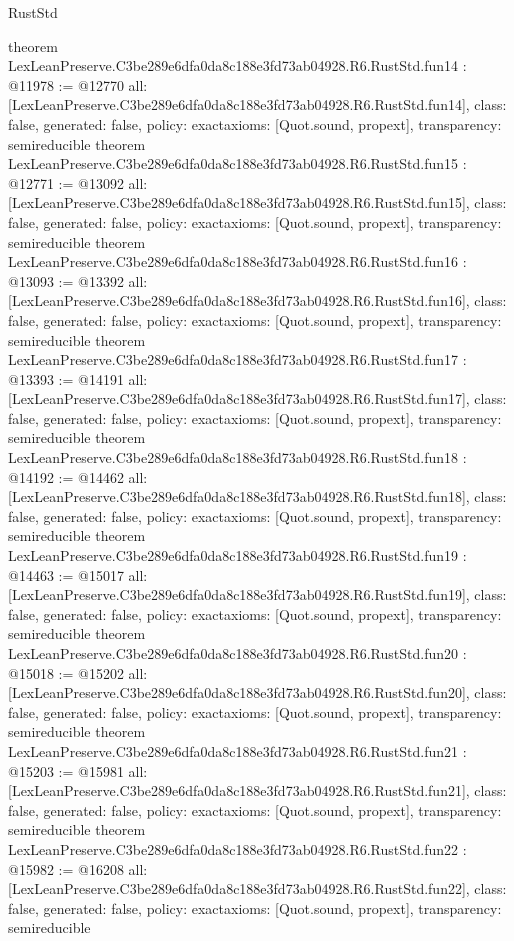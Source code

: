 \begin{lexlean}{RustStd}
\begin{coremodule}
{}
theorem LexLeanPreserve.C3be289e6dfa0da8c188e3fd73ab04928.R6.RustStd.fun14 : @11978 := @12770 {
  all: [LexLeanPreserve.C3be289e6dfa0da8c188e3fd73ab04928.R6.RustStd.fun14],
  class: false,
  generated: false,
  policy: exact{axioms: [Quot.sound, propext]},
  transparency: semireducible
}
theorem LexLeanPreserve.C3be289e6dfa0da8c188e3fd73ab04928.R6.RustStd.fun15 : @12771 := @13092 {
  all: [LexLeanPreserve.C3be289e6dfa0da8c188e3fd73ab04928.R6.RustStd.fun15],
  class: false,
  generated: false,
  policy: exact{axioms: [Quot.sound, propext]},
  transparency: semireducible
}
theorem LexLeanPreserve.C3be289e6dfa0da8c188e3fd73ab04928.R6.RustStd.fun16 : @13093 := @13392 {
  all: [LexLeanPreserve.C3be289e6dfa0da8c188e3fd73ab04928.R6.RustStd.fun16],
  class: false,
  generated: false,
  policy: exact{axioms: [Quot.sound, propext]},
  transparency: semireducible
}
theorem LexLeanPreserve.C3be289e6dfa0da8c188e3fd73ab04928.R6.RustStd.fun17 : @13393 := @14191 {
  all: [LexLeanPreserve.C3be289e6dfa0da8c188e3fd73ab04928.R6.RustStd.fun17],
  class: false,
  generated: false,
  policy: exact{axioms: [Quot.sound, propext]},
  transparency: semireducible
}
theorem LexLeanPreserve.C3be289e6dfa0da8c188e3fd73ab04928.R6.RustStd.fun18 : @14192 := @14462 {
  all: [LexLeanPreserve.C3be289e6dfa0da8c188e3fd73ab04928.R6.RustStd.fun18],
  class: false,
  generated: false,
  policy: exact{axioms: [Quot.sound, propext]},
  transparency: semireducible
}
theorem LexLeanPreserve.C3be289e6dfa0da8c188e3fd73ab04928.R6.RustStd.fun19 : @14463 := @15017 {
  all: [LexLeanPreserve.C3be289e6dfa0da8c188e3fd73ab04928.R6.RustStd.fun19],
  class: false,
  generated: false,
  policy: exact{axioms: [Quot.sound, propext]},
  transparency: semireducible
}
theorem LexLeanPreserve.C3be289e6dfa0da8c188e3fd73ab04928.R6.RustStd.fun20 : @15018 := @15202 {
  all: [LexLeanPreserve.C3be289e6dfa0da8c188e3fd73ab04928.R6.RustStd.fun20],
  class: false,
  generated: false,
  policy: exact{axioms: [Quot.sound, propext]},
  transparency: semireducible
}
theorem LexLeanPreserve.C3be289e6dfa0da8c188e3fd73ab04928.R6.RustStd.fun21 : @15203 := @15981 {
  all: [LexLeanPreserve.C3be289e6dfa0da8c188e3fd73ab04928.R6.RustStd.fun21],
  class: false,
  generated: false,
  policy: exact{axioms: [Quot.sound, propext]},
  transparency: semireducible
}
theorem LexLeanPreserve.C3be289e6dfa0da8c188e3fd73ab04928.R6.RustStd.fun22 : @15982 := @16208 {
  all: [LexLeanPreserve.C3be289e6dfa0da8c188e3fd73ab04928.R6.RustStd.fun22],
  class: false,
  generated: false,
  policy: exact{axioms: [Quot.sound, propext]},
  transparency: semireducible
}
\end{coremodule}
\end{lexlean}

